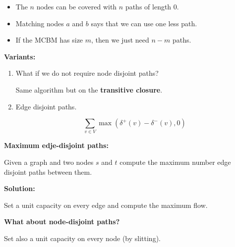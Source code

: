 \documentclass{beamer}
\begin{document}
\begin{frame}
 
\begin{itemize}
 \item The $n$ nodes can be covered with $n$ paths of length $0$.
 \vspace{0.5cm}
 \item Matching nodes $a$ and $b$ says that we can use one less path.
 \vspace{0.5cm}
 \item If the MCBM has size $m$, then we just need $n - m$ paths. 
\end{itemize}
 
\pause 
 
\vspace{0.5cm} 
 
\textbf{Variants:}

\begin{enumerate}
 
 \item What if we do not require node disjoint paths?
 
 \pause
 
 \vspace{0.25cm}
 
 Same algorithm but on the \textbf{transitive closure}.

 \pause
 
 \vspace{0.5cm}
 
 \item Edge disjoint paths.
 
 \pause
 $$
 \sum_{v \in V} \max \left( \delta^+(v) - \delta^-(v), 0 \right)
 $$
 
\end{enumerate}

 
\end{frame}

\begin{frame}

\textbf{Maximum edje-disjoint paths:}

\vspace{1cm}

Given a graph and two nodes $s$ and $t$ compute the maximum number edge disjoint paths
between them.
 
\pause

\vspace{0.5cm}

\textbf{Solution:}

Set a unit capacity on every edge and compute the maximum flow.

\vspace{0.5cm}

\textbf{What about node-disjoint paths?}

\pause

Set also a unit capacity on every node (by slitting).

\end{frame}
\end{document}
